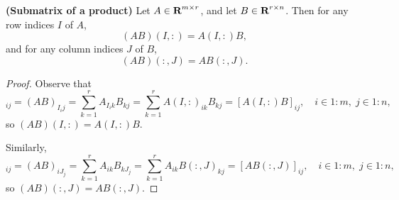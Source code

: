 \documentclass{article}
\begin{document}
	\begin{lem} \textnormal{\bf(Submatrix of a product)}
		\label{lem:submatrix_prod}
		Let $A\in \textnormal{\bf R}^{m\times r}$, and let $B\in \textnormal{\bf R}^{r\times n}$. Then for any row indices $I$ of $A$,
		\begin{equation}
			(AB)(I,:) = A(I,:)B,
		\end{equation}
		and for any column indices $J$ of $B$,
		\begin{equation}
			(AB)(:,J) = AB(:,J).
		\end{equation}
	\end{lem}
	
	\begin{proof}
		Observe that
		\begin{equation}
			[(AB)(I,:)]_{ij} = (AB)_{I_ij} = \sum_{k=1}^rA_{I_ik}B_{kj} = \sum_{k=1}^rA(I,:)_{ik}B_{kj} = [A(I,:)B]_{ij}, \quad i\in 1:m,\; j\in 1:n,
		\end{equation}
		so $(AB)(I,:) = A(I,:)B$.
		
		Similarly,
		\begin{equation}
			[(AB)(:,J)]_{ij} = (AB)_{iJ_j} = \sum_{k=1}^rA_{ik}B_{kJ_j} = \sum_{k=1}^rA_{ik}B(:,J)_{kj} = [AB(:,J)]_{ij}, \quad i\in 1:m,\; j\in 1:n,
		\end{equation}
		so $(AB)(:,J) = AB(:,J)$.
	\end{proof}
\end{document}
